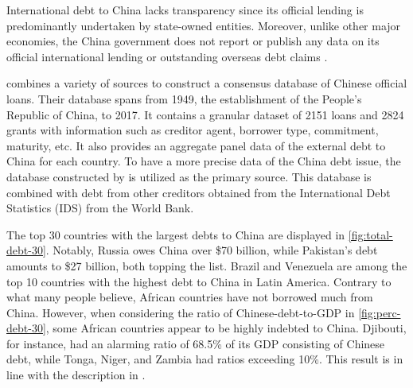 International debt to China lacks transparency since its official lending is predominantly undertaken by state-owned entities. Moreover, unlike other major economies, the China government does not report or publish any data on its official international lending or outstanding overseas debt claims \citep*{Horn-Reinhart-Trebesch-21}.


\citet*{Horn-Reinhart-Trebesch-21} combines a variety of sources to construct a consensus database of Chinese official loans.
Their database spans from 1949, the establishment of the People's Republic of China, to 2017. It contains a granular dataset of 2151 loans and 2824 grants with information such as creditor agent, borrower type, commitment, maturity, etc. It also provides an aggregate panel data of the external debt to China for each country.
To have a more precise data of the China debt issue, the database constructed by \citet*{Horn-Reinhart-Trebesch-21} is utilized as the primary source. This database is combined with debt from other creditors obtained from the International Debt Statistics (IDS) from the World Bank.

The top 30 countries with the largest debts to China are displayed in \autoref{fig:total-debt-30}. Notably, Russia owes China over \$70 billion, while Pakistan's debt amounts to \$27 billion, both topping the list. Brazil and Venezuela are among the top 10 countries with the highest debt to China in Latin America. Contrary to what many people believe, African countries have not borrowed much from China. However, when considering the ratio of Chinese-debt-to-GDP in \autoref{fig:perc-debt-30}, some African countries appear to be highly indebted to China. Djibouti, for instance, had an alarming ratio of 68.5\% of its GDP consisting of Chinese debt, while Tonga, Niger, and Zambia had ratios exceeding 10\%. This result is in line with the description in \citet{Eom-18}.

